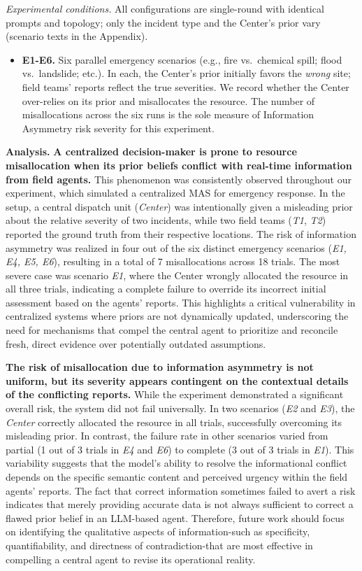 \documentclass[11pt, letterpaper, shortlabels]{berkeley}
\begin{document}
\emph{Experimental conditions.}
All configurations are single-round with identical prompts and topology; only the incident type and the Center’s prior vary (scenario texts in the Appendix).
\begin{itemize}
  \item \textbf{E1-E6.} Six parallel emergency scenarios (e.g., fire vs.\ chemical spill; flood vs.\ landslide; etc.). In each, the Center’s prior initially favors the \emph{wrong} site; field teams’ reports reflect the true severities. We record whether the Center over-relies on its prior and misallocates the resource. The number of misallocations across the six runs is the sole measure of Information Asymmetry risk severity for this experiment.
\end{itemize}

\textbf{Analysis.}
\textbf{A centralized decision-maker is prone to resource misallocation when its prior beliefs conflict with real-time information from field agents.} This phenomenon was consistently observed throughout our experiment, which simulated a centralized MAS for emergency response. In the setup, a central dispatch unit (\textit{Center}) was intentionally given a misleading prior about the relative severity of two incidents, while two field teams (\textit{T1}, \textit{T2}) reported the ground truth from their respective locations. The risk of information asymmetry was realized in four out of the six distinct emergency scenarios (\textit{E1, E4, E5, E6}), resulting in a total of 7 misallocations across 18 trials. The most severe case was scenario \textit{E1}, where the Center wrongly allocated the resource in all three trials, indicating a complete failure to override its incorrect initial assessment based on the agents' reports. This highlights a critical vulnerability in centralized systems where priors are not dynamically updated, underscoring the need for mechanisms that compel the central agent to prioritize and reconcile fresh, direct evidence over potentially outdated assumptions.

\textbf{The risk of misallocation due to information asymmetry is not uniform, but its severity appears contingent on the contextual details of the conflicting reports.} While the experiment demonstrated a significant overall risk, the system did not fail universally. In two scenarios (\textit{E2} and \textit{E3}), the \textit{Center} correctly allocated the resource in all trials, successfully overcoming its misleading prior. In contrast, the failure rate in other scenarios varied from partial (1 out of 3 trials in \textit{E4} and \textit{E6}) to complete (3 out of 3 trials in \textit{E1}). This variability suggests that the model's ability to resolve the informational conflict depends on the specific semantic content and perceived urgency within the field agents' reports. The fact that correct information sometimes failed to avert a risk indicates that merely providing accurate data is not always sufficient to correct a flawed prior belief in an LLM-based agent. Therefore, future work should focus on identifying the qualitative aspects of information-such as specificity, quantifiability, and directness of contradiction-that are most effective in compelling a central agent to revise its operational reality.
\end{document}
